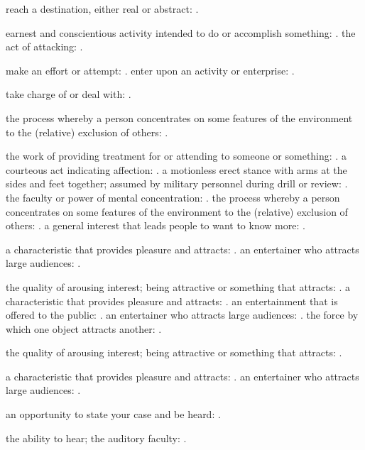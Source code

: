   reach a destination, either real or abstract: .

  earnest and conscientious activity intended to do or accomplish something: . the act of attacking: .

  make an effort or attempt: . enter upon an activity or enterprise: .

  take charge of or deal with: .

  the process whereby a person concentrates on some features of the environment to the (relative) exclusion of others: .

  the work of providing treatment for or attending to someone or something: . a courteous act indicating affection: . a motionless erect stance with arms at the sides and feet together; assumed by military personnel during drill or review: . the faculty or power of mental concentration: . the process whereby a person concentrates on some features of the environment to the (relative) exclusion of others: . a general interest that leads people to want to know more: .

  a characteristic that provides pleasure and attracts: . an entertainer who attracts large audiences: .

  the quality of arousing interest; being attractive or something that attracts: . a characteristic that provides pleasure and attracts: . an entertainment that is offered to the public: . an entertainer who attracts large audiences: . the force by which one object attracts another: .

  the quality of arousing interest; being attractive or something that attracts: .

  a characteristic that provides pleasure and attracts: . an entertainer who attracts large audiences: .

  an opportunity to state your case and be heard: .

  the ability to hear; the auditory faculty: .

